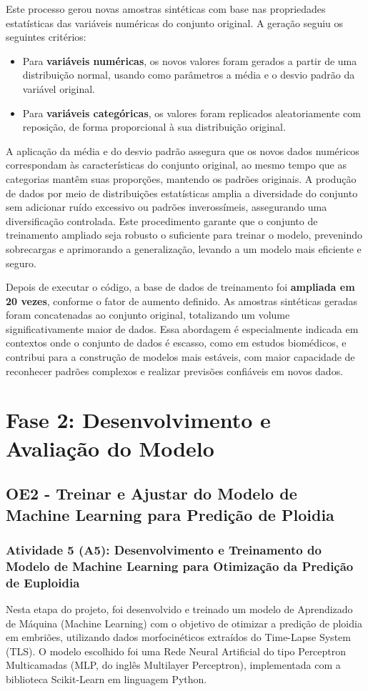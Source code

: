 Este processo gerou novas amostras sintéticas com base nas propriedades estatísticas das variáveis numéricas do conjunto original. A geração seguiu os seguintes critérios:
\begin{itemize}
    \item Para \textbf{variáveis numéricas}, os novos valores foram gerados a partir de uma distribuição normal, usando como parâmetros a média e o desvio padrão da variável original.
    \item Para \textbf{variáveis categóricas}, os valores foram replicados aleatoriamente com reposição, de forma proporcional à sua distribuição original.
\end{itemize}

A aplicação da média e do desvio padrão assegura que os novos dados numéricos correspondam às características do conjunto original, ao mesmo tempo que as categorias mantêm suas proporções, mantendo os padrões originais. A produção de dados por meio de distribuições estatísticas amplia a diversidade do conjunto sem adicionar ruído excessivo ou padrões inverossímeis, assegurando uma diversificação controlada. Este procedimento garante que o conjunto de treinamento ampliado seja robusto o suficiente para treinar o modelo, prevenindo sobrecargas e aprimorando a generalização, levando a um modelo mais eficiente e seguro.

Depois de executar o código, a base de dados de treinamento foi  \textbf{ampliada em 20 vezes}, conforme o fator de aumento definido. As amostras sintéticas geradas foram concatenadas ao conjunto original, totalizando um volume significativamente maior de dados. Essa abordagem é especialmente indicada em contextos onde o conjunto de dados é escasso, como em estudos biomédicos, e contribui para a construção de modelos mais estáveis, com maior capacidade de reconhecer padrões complexos e realizar previsões confiáveis em novos dados.

\section{Fase 2: Desenvolvimento e Avaliação do Modelo}
\subsection{OE2 - Treinar e Ajustar do Modelo de Machine Learning para Predição de Ploidia}
\subsubsection{Atividade 5 (A5): Desenvolvimento e Treinamento do Modelo de Machine Learning para Otimização da Predição de Euploidia}
Nesta etapa do projeto, foi desenvolvido e treinado um modelo de Aprendizado de Máquina (Machine Learning) com o objetivo de otimizar a predição de ploidia em embriões, utilizando dados morfocinéticos extraídos do Time-Lapse System (TLS). O modelo escolhido foi uma Rede Neural Artificial do tipo Perceptron Multicamadas (MLP, do inglês Multilayer Perceptron), implementada com a biblioteca Scikit-Learn em linguagem Python.

